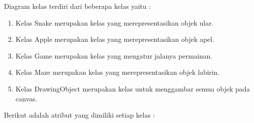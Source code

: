 Diagram kelas terdiri dari beberapa kelas yaitu :

\begin{enumerate}
	\item Kelas Snake merupakan  kelas yang merepresentasikan objek ular.
	\item Kelas Apple merupakan kelas yang merepresentasikan objek apel.
	\item Kelas Game merupakan kelas yang mengatur jalanya permainan.
	\item Kelas Maze merupakan kelas yang merepresentasikan objek labirin.
	\item Kelas DrawingObject merupakan kelas untuk menggambar semua objek pada canvas.
\end{enumerate}

Berikut adalah atribut yang dimiliki setiap kelas :

